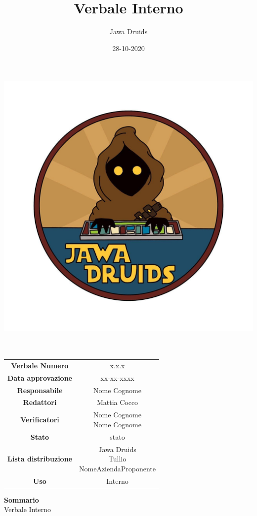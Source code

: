 \documentclass[a4paper,12pt]{report}
\begin{document}
	
	\makeatletter
	\begin{titlepage}
		\begin{center}
			\vspace*{-4,0cm}
			\author{Jawa Druids} 
			\title{Verbale Interno}
			\date{28-10-2020} %
			\includegraphics[width=0.7\linewidth]{../../immagini/DRUIDSLOGO.jpg}\\[4ex]
			{\huge \bfseries  \@title }\\[2ex] 
			{\LARGE  \@author}\\[50ex]
			\vspace*{-8,0cm}
			\begin{table}[H]
				\centering
				\begin{tabular}{c|c}
					\textbf{Verbale Numero} & x.x.x \\
					\textbf{Data approvazione} & xx-xx-xxxx\\
					\textbf{Responsabile} & Nome Cognome\\
					\textbf{Redattori} & Mattia Cocco \\
					\textbf{Verificatori} & \makecell{Nome Cognome \\ Nome Cognome} \\
					\textbf{Stato} & stato\\
					\textbf{Lista distribuzione} & \makecell{Jawa Druids \\ Tullio \\ NomeAziendaProponente}\\
					\textbf{Uso} & Interno            
				\end{tabular}
			\end{table}
			\fontsize{16}{10}\textbf{Sommario} \\
			Verbale Interno			
		\end{center}
	\end{titlepage}
\end{document}
